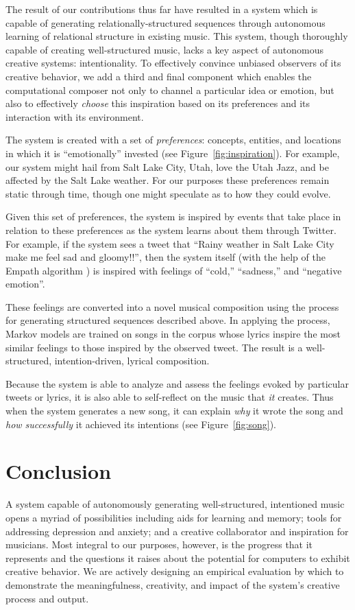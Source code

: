 \documentclass[letterpaper]{article}
\begin{document}
The result of our contributions thus far have resulted in a system which is capable of generating relationally-structured sequences through autonomous learning of relational structure in existing music. This system, though thoroughly capable of creating well-structured music, lacks a key aspect of autonomous creative systems: intentionality. To effectively convince unbiased observers of its creative behavior, we add a third and final component which enables the computational composer not only to channel a particular idea or emotion, but also to effectively \emph{choose} this inspiration based on its preferences and its interaction with its environment.

The system is created with a set of \emph{preferences}: concepts, entities, and locations in which it is ``emotionally'' invested (see Figure~\ref{fig:inspiration}). For example, our system might hail from Salt Lake City, Utah, love the Utah Jazz, and be affected by the Salt Lake weather. For our purposes these preferences remain static through time, though one might speculate as to how they could evolve.

Given this set of preferences, the system is inspired by events that take place in relation to these preferences as the system learns about them through Twitter. For example, if the system sees a tweet that ``Rainy weather in Salt Lake City make me feel sad and gloomy!!'', then the system itself (with the help of the Empath algorithm \cite{fast2016empath}) is inspired with feelings of ``cold,'' ``sadness,'' and ``negative emotion''.

These feelings are converted into a novel musical composition using the process for generating structured sequences described above. In applying the process, Markov models are trained on songs in the corpus whose lyrics inspire the most similar feelings to those inspired by the observed tweet. The result is a well-structured, intention-driven, lyrical composition.


Because the system is able to analyze and assess the feelings evoked by particular tweets or lyrics, it is also able to self-reflect on the music that \emph{it} creates. Thus when the system generates a new song, it can explain \emph{why} it wrote the song and \emph{how successfully} it achieved its intentions (see Figure~\ref{fig:song}).  

\section{Conclusion}

A system capable of autonomously generating well-structured, intentioned music opens a myriad of possibilities including aids for learning and memory; tools for addressing depression and anxiety; and a creative collaborator and inspiration for musicians. Most integral to our purposes, however, is the progress that it represents and the questions it raises about the potential for computers to exhibit creative behavior. We are actively designing an empirical evaluation by which to demonstrate the meaningfulness, creativity, and impact of the system's creative process and output.



\end{document}
